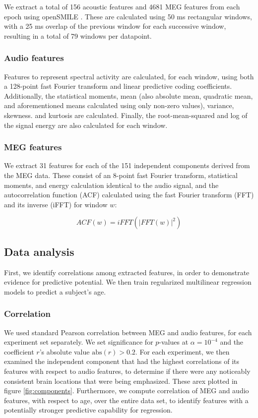 \documentclass[a4paper]{article}
\begin{document}
We extract a total of 156 acoustic features and 4681 MEG features from each epoch using openSMILE \cite{Eyben13-RDI}. These are calculated using 50 ms rectangular windows, with a 25 ms overlap of the previous window for each successive window, resulting in a total of 79 windows per datapoint.

\subsubsection{Audio features}

Features to represent spectral activity are calculated, for each window, using both a 128-point fast Fourier transform and linear predictive coding coefficients. Additionally, the statistical moments, mean (also absolute mean, quadratic mean, and aforementioned means calculated using only non-zero values), variance, skewness. and kurtosis are calculated. Finally, the root-mean-squared and log of the signal energy are also calculated for each window.

\subsubsection{MEG features}

We extract 31 features for each of the 151 independent components derived from the MEG data. These consist of an 8-point fast Fourier transform, statistical moments, and energy calculation identical to the audio signal, and the autocorrelation function (ACF) calculated using the fast Fourier transform (FFT) and its inverse (iFFT) for window $w$:

\begin{equation}
  ACF(w) = iFFT(|FFT(w)|^2)
  \label{eq1}
\end{equation}

\subsection{Data analysis}

First, we identify correlations among extracted features, in order to demonstrate evidence for predictive potential. We then train regularized multilinear regression models to predict a subject's age.

\subsubsection{Correlation}

We used standard Pearson correlation between MEG and audio features, for each experiment set separately. We set significance for $p$-values at $\alpha = 10^{-4}$ and the coefficient $r$'s absolute value $\text{abs}(r) > 0.2$. For each experiment, we then examined the independent component that had the highest correlations of its features with respect to audio features, to determine if there were any noticeably consistent brain locations that were being emphasized. These arex plotted in figure \ref{fig:components}. Furthermore, we compute correlation of MEG and audio features, with respect to age, over the entire data set, to identify features with a potentially stronger predictive capability for regression.
\end{document}
